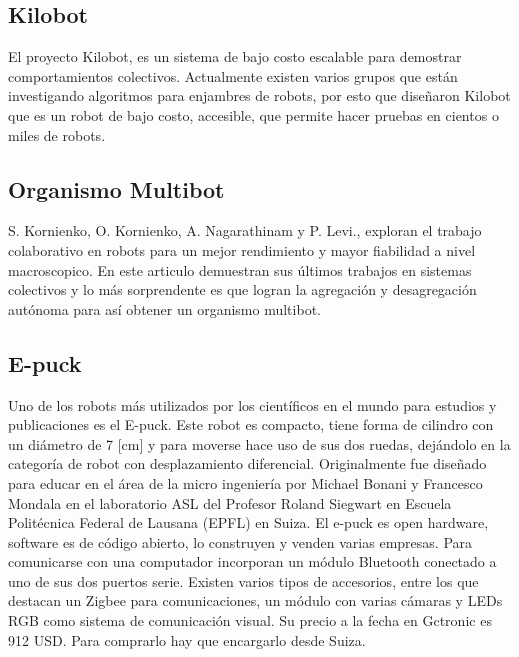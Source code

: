\subsection{Kilobot}
El proyecto Kilobot, es un sistema de bajo costo escalable para demostrar comportamientos colectivos. Actualmente existen varios grupos que están investigando algoritmos para enjambres de robots, por esto que diseñaron Kilobot que es un robot de bajo costo, accesible,  que permite hacer pruebas en cientos o miles de robots.




\subsection{Organismo Multibot}

S. Kornienko, O. Kornienko, A. Nagarathinam y P. Levi., exploran el trabajo colaborativo en robots para un mejor rendimiento y mayor fiabilidad a nivel macroscopico. En este articulo demuestran sus últimos trabajos en sistemas colectivos y lo más sorprendente es que logran la agregación y desagregación autónoma para así obtener un organismo multibot.
\cite{5359578}



\subsection{E-puck}

Uno de los robots más utilizados por los científicos en el mundo para estudios y publicaciones es el E-puck. Este robot es compacto, tiene forma de cilindro con un diámetro de 7 [cm] y para moverse hace uso de sus dos ruedas, dejándolo en la categoría de robot con desplazamiento diferencial. Originalmente fue diseñado para educar en el área de la micro ingeniería por Michael Bonani y Francesco Mondala en el laboratorio ASL del Profesor Roland Siegwart en Escuela Politécnica Federal de Lausana (EPFL) en Suiza. El e-puck es open hardware, software es de código abierto,  lo construyen y venden varias empresas. Para comunicarse con una computador incorporan un módulo Bluetooth conectado a uno de sus dos puertos serie. Existen varios tipos de accesorios, entre los que destacan un Zigbee para comunicaciones, un módulo con varias cámaras y LEDs RGB como sistema de comunicación visual. Su precio a la fecha en Gctronic es 912 USD. Para comprarlo hay que encargarlo desde Suiza.



